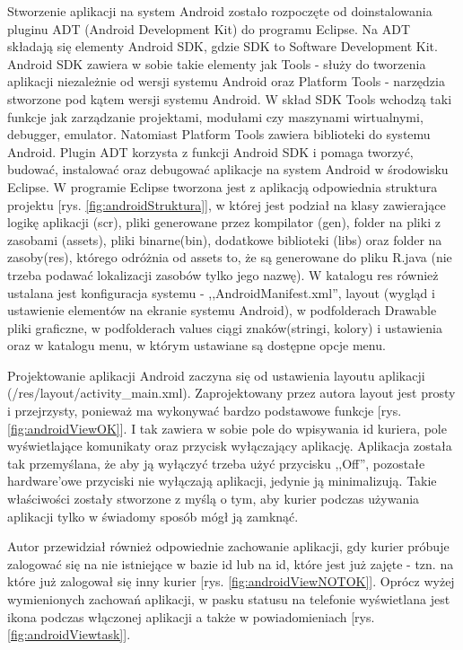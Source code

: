 \documentclass[eng,printmode,oneside]{mgr}
\begin{document}
Stworzenie aplikacji na system Android zostało rozpoczęte od doinstalowania
pluginu ADT (Android Development Kit) do programu Eclipse. Na ADT składają się
elementy Android SDK, gdzie SDK to Software Development Kit. Android SDK
zawiera w sobie takie elementy jak Tools - służy do tworzenia aplikacji niezależnie od
wersji systemu Android oraz Platform Tools - narzędzia stworzone pod kątem
wersji systemu Android. W skład SDK Tools wchodzą taki funkcje jak zarządzanie
projektami, modułami czy maszynami wirtualnymi, debugger, emulator. Natomiast
Platform Tools zawiera biblioteki do systemu Android. Plugin ADT  korzysta
z funkcji Android SDK i pomaga tworzyć, budować, instalować oraz debugować
aplikacje na system Android w środowisku Eclipse. W programie Eclipse tworzona
jest z aplikacją odpowiednia struktura projektu [rys. \ref{fig:androidStruktura}], w
której jest podział na klasy zawierające logikę aplikacji (scr), pliki generowane przez kompilator (gen),
folder na pliki z zasobami (assets), pliki binarne(bin), dodatkowe biblioteki
(libs) oraz folder na zasoby(res), którego odróżnia od assets to, że są
generowane do pliku R.java (nie trzeba podawać lokalizacji zasobów tylko jego
nazwę). W katalogu res również ustalana jest konfiguracja systemu - 
,,AndroidManifest.xml'', layout (wygląd i ustawienie elementów na ekranie
systemu Android), w podfolderach Drawable pliki graficzne, w podfolderach values
ciągi znaków(stringi, kolory) i ustawienia oraz w katalogu menu, w którym
ustawiane są dostępne opcje menu.

Projektowanie aplikacji Android zaczyna się od ustawienia layoutu aplikacji
(/res/layout/activity\_main.xml). Zaprojektowany przez autora layout jest
prosty i przejrzysty, ponieważ ma wykonywać bardzo podstawowe funkcje [rys.
\ref{fig:androidViewOK}]. I tak zawiera w sobie pole do wpisywania id kuriera,
pole wyświetlające komunikaty oraz przycisk wyłączający aplikację. Aplikacja została
tak przemyślana, że aby ją wyłączyć trzeba użyć przycisku ,,Off'', pozostałe hardware'owe przyciski
nie wyłączają aplikacji, jedynie ją minimalizują. Takie właściwości zostały
stworzone z myślą o tym, aby kurier podczas używania aplikacji tylko w świadomy
sposób mógł ją zamknąć.

Autor przewidział również odpowiednie zachowanie aplikacji, gdy kurier próbuje
zalogować się na nie istniejące w bazie id lub na id, które jest już zajęte -
tzn. na które już zalogował się inny kurier [rys. \ref{fig:androidViewNOTOK}]. 
Oprócz wyżej wymienionych zachowań aplikacji, w pasku statusu na telefonie
wyświetlana jest ikona podczas włączonej aplikacji a także w
powiadomieniach [rys. \ref{fig:androidViewtask}].
\end{document}
